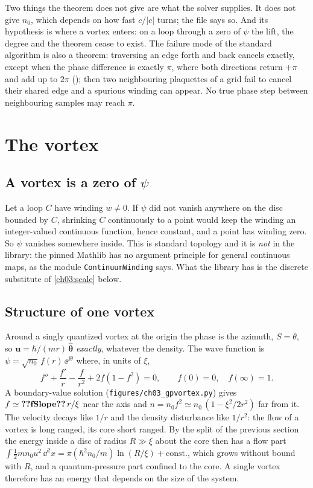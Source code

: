 Two things the theorem does not give are what the solver supplies. It does not give $n_0$, which depends on how fast $c/|c|$ turns; the file says so. And its hypothesis  is where a vortex enters: on a loop through a zero of $\psi$ the lift, the degree and the theorem cease to exist. The failure mode of the standard algorithm is also a theorem: traversing an edge forth and back cancels exactly, except when the phase difference is exactly $\pi$, where both directions return $+\pi$ and add up to $2\pi$ (); then two neighbouring plaquettes of a grid fail to cancel their shared edge and a spurious winding can appear. No true phase step between neighbouring samples may reach $\pi$.

\section{The vortex}\label{ch03:vortex}

\subsection{A vortex is a zero of \texorpdfstring{$\psi$}{psi}}\label{ch03:zero}Let a loop $C$ have winding $w\neq0$. If $\psi$ did not vanish anywhere on the disc bounded by $C$, shrinking $C$ continuously to a point would keep the winding an integer-valued continuous function, hence constant, and a point has winding zero. So $\psi$ vanishes somewhere inside. This is standard topology and it is \emph{not} in the library: the pinned Mathlib has no argument principle for general continuous maps, as the module \texttt{ContinuumWinding} says. What the library has is the discrete substitute of \cref{ch03:scale} below.

\subsection{Structure of one vortex}Around a singly quantized vortex at the origin the phase is the azimuth, $S=\theta$, so $\mathbf u=\hbar/(mr)\,\hat{\boldsymbol\theta}$ \emph{exactly}, whatever the density. The wave function is $\psi=\sqrt{n_0}\,f(r)\,\ee^{\ii\theta}$ where, in units of $\xi$,
\begin{equation}\label{ch03:eq-profile}
  f''+\frac{f'}{r}-\frac{f}{r^2}+2f(1-f^2)=0,\qquad f(0)=0,\quad f(\infty)=1 .
\end{equation}
A boundary-value solution (\texttt{figures/ch03\_gpvortex.py}) gives $f\simeq\cthreeNum{fSlope}\,r/\xi$ near the axis and $n=n_0f^2\simeq n_0\,(1-\xi^2/2r^2)$ far from it. The velocity decays like $1/r$ and the density disturbance like $1/r^2$: the flow of a vortex is long ranged, its core short ranged. By the split of the previous section the energy inside a disc of radius $R\gg\xi$ about the core then has a flow part $\int\frac12mn_0u^2\,\dd^2x=\pi(\hbar^2n_0/m)\ln(R/\xi)+\text{const.}$, which grows without bound with $R$, and a quantum-pressure part confined to the core. A single vortex therefore has an energy that depends on the size of the system.


